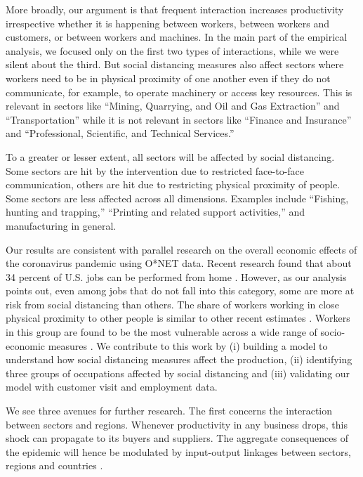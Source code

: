 \documentclass[10pt,letterpaper]{article}
\begin{document}
More broadly, our argument is that frequent interaction increases productivity irrespective whether it is happening between workers, between workers and customers, or between workers and machines. In the main part of the empirical analysis, we focused only on the first two types of interactions, while we were silent about the third. But social distancing measures also affect sectors where workers need to be in physical proximity of one another even if they do not communicate, for example, to operate machinery or access key resources. This is relevant in sectors like ``Mining, Quarrying, and Oil and Gas Extraction'' and ``Transportation'' while it is not relevant in sectors like ``Finance and Insurance'' and ``Professional, Scientific, and Technical Services.'' 

To a greater or lesser extent, all sectors will be affected by social distancing. Some sectors are hit by the intervention due to restricted face-to-face communication, others are hit due to restricting physical proximity of people. Some sectors are less affected across all dimensions. Examples include ``Fishing, hunting and trapping,'' ``Printing and related support activities,'' and manufacturing in general. 

Our results are consistent with parallel research on the overall economic effects of the coronavirus pandemic using O*NET data. Recent research found that about 34 percent of U.S. jobs can be performed from home \cite{Dingel2020-lh}. However, as our analysis points out, even among jobs that do not fall into this category, some are more at risk from social distancing than others. The share of workers working in close physical proximity to other people is similar to other recent estimates \cite{Leibovici2020-qr}. Workers in this group are found to be the most vulnerable across a wide range of socio-economic measures \cite{Jin2020-tq,Mongey2020-qc}. We contribute to this work by (i) building a model to understand how social distancing measures affect the production, (ii) identifying three groups of occupations affected by social distancing and (iii) validating our model with customer visit and employment data.

We see three avenues for further research. The first concerns the interaction between sectors and regions. Whenever productivity in any business drops, this shock can propagate to its buyers and suppliers. The aggregate consequences of the epidemic will hence be modulated by input-output linkages between sectors, regions and countries \cite{Caliendo2014-mr,Caselli2020-nf,Baldwin2020-wb,Barrot2020-jf}.
\end{document}
